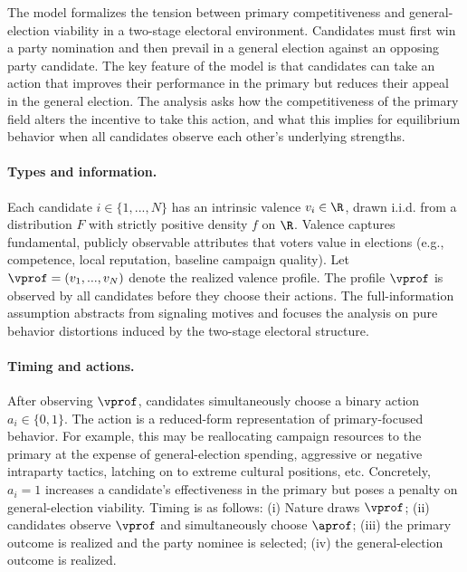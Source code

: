 The model formalizes the tension between primary competitiveness and general-election viability in a two-stage electoral environment. Candidates must first win a party nomination and then prevail in a general election against an opposing party candidate. The key feature of the model is that candidates can take an action that improves their performance in the primary but reduces their appeal in the general election. The analysis asks how the competitiveness of the primary field alters the incentive to take this action, and what this implies for equilibrium behavior when all candidates observe each other’s underlying strengths.

\paragraph{Types and information.}
Each candidate $i \in \{1,...,N\}$ has an intrinsic valence $v_i \in \R$, drawn i.i.d. from a distribution $F$ with strictly positive density $f$ on $\R$. Valence captures fundamental, publicly observable attributes that voters value in elections (e.g., competence, local reputation, baseline campaign quality). Let $\vprof = (v_1,...,v_N)$ denote the realized valence profile. The profile $\vprof$ is observed by all candidates before they choose their actions. The full-information assumption abstracts from signaling motives and focuses the analysis on pure behavior distortions induced by the two-stage electoral structure.

\paragraph{Timing and actions.}
After observing $\vprof$, candidates simultaneously choose a binary action $a_i \in \{0,1\}$. The action is a reduced-form representation of primary-focused behavior. For example, this may be reallocating campaign resources to the primary at the expense of general-election spending, aggressive or negative intraparty tactics, latching on to extreme cultural positions, etc. Concretely, $a_i = 1$ increases a candidate's effectiveness in the primary but poses a penalty on general-election viability. Timing is as follows: (i) Nature draws $\vprof$; (ii) candidates observe $\vprof$ and simultaneously choose $\aprof$; (iii) the primary outcome is realized and the party nominee is selected; (iv) the general-election outcome is realized. 

